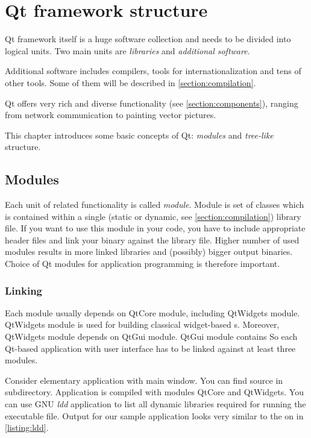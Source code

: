 \chapter{Qt framework structure}\label{section:qtstructure}
Qt framework itself is a huge software collection and needs to be divided into logical units. Two main units are \textit{libraries} and \textit{additional software}.

Additional software includes compilers, tools for internationalization and tens of other tools. Some of them will be described in \autoref{section:compilation}.

Qt offers very rich and diverse functionality (see \autoref{section:components}), ranging from network communication to painting vector pictures.

This chapter introduces some basic concepts of Qt: \textit{modules} and \textit{tree-like} structure.

\section{Modules}
Each unit of related functionality is called \textit{module}. Module is set of classes which is contained within a single (static or dynamic, see \autoref{section:compilation}) library file. If you want to use this module in your code, you have to include appropriate header files and link your binary against the library file. Higher number of used modules results in more linked libraries and (possibly) bigger output binaries. Choice of Qt modules for application programming is therefore important.

\subsection{Linking}\label{listing:linking}
Each module usually depends on QtCore module, including QtWidgets module. QtWidgets module is used for building classical widget-based s. Moreover, QtWidgets module depends on QtGui module. QtGui module contains  So each Qt-based application with user interface has to be linked against at least three modules.

Consider elementary  application with main window. You can find source in subdirectory. Application is compiled with modules QtCore and QtWidgets. You can use GNU \textit{ldd} application to list all dynamic libraries required for running the executable file. Output for our sample application looks very similar to the on in \autoref{listing:ldd}.

